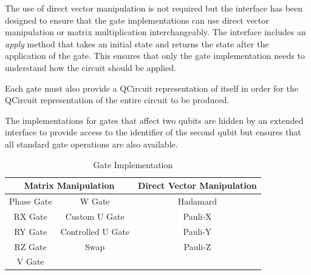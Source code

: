 The use of direct vector manipulation is not required but the interface has been designed to ensure that the gate implementations can use direct vector manipulation or matrix multiplication interchangeably.
The interface includes an \emph{apply} method that takes an initial state and returns the state after the application of the gate.
This ensures that only the gate implementation needs to understand how the circuit should be applied.

Each gate must also provide a QCircuit \cite{QCsite} representation of itself in order for the QCircuit representation of the entire circuit to be produced.

The implementations for gates that affect two qubits are hidden by an extended interface to provide access to the identifier of the second qubit but ensures that all standard gate operations are also available.

\begin{table}
\centering
\begin{tabular}{ | c | c || c | }
\hline
\multicolumn{2}{|c||}{\textbf{Matrix Manipulation}} & \textbf{Direct Vector Manipulation} \\ \hline
Phase Gate & W Gate &Hadamard \\ \hline
RX Gate &Custom U Gate & Pauli-X \\ \hline
RY Gate &Controlled U Gate & Pauli-Y \\ \hline
RZ Gate &Swap & Pauli-Z \\ \hline
V Gate && \\ \hline
\end{tabular}
\caption{Gate Implementation}
\label{tab:gateimps}
\end{table}

